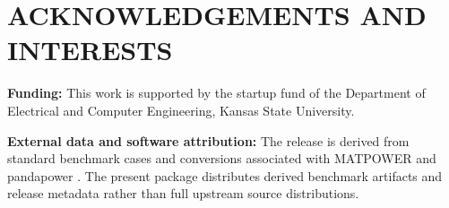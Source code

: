 \balance
\section*{ACKNOWLEDGEMENTS AND INTERESTS}


\textbf{Funding:} This work is supported by the startup fund of the Department of Electrical and Computer Engineering, Kansas State University.

\textbf{External data and software attribution:} The release is derived from standard benchmark cases and conversions associated with MATPOWER and pandapower \cite{zimmerman2011matpower,thurner2018pandapower}. 
The present package distributes derived benchmark artifacts and release metadata rather than full upstream source distributions.
